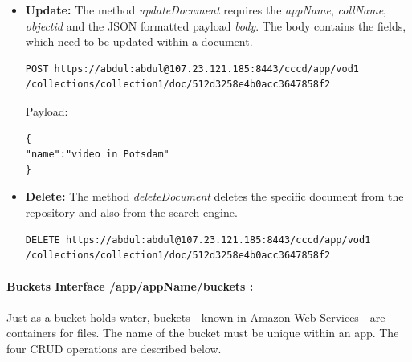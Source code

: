 \begin{itemize}
\item \textbf{Update:} The method \textit{updateDocument} requires the \textit{appName}, \textit{collName}, \textit{objectid} and the \ac{JSON} formatted payload \textit{body}. The body contains  the fields, which need to be updated within a document.

\begin{code}
\begin{verbatim}
POST https://abdul:abdul@107.23.121.185:8443/cccd/app/vod1
/collections/collection1/doc/512d3258e4b0acc3647858f2
\end{verbatim}
Payload:
\begin{verbatim}
{
"name":"video in Potsdam"
}
\end{verbatim}
\end{code}

\item \textbf{Delete:} The method \textit{deleteDocument} deletes the specific document from the repository and also from the search engine.

\begin{code}
\begin{verbatim}
DELETE https://abdul:abdul@107.23.121.185:8443/cccd/app/vod1
/collections/collection1/doc/512d3258e4b0acc3647858f2
\end{verbatim}
\end{code}
 
\end{itemize}
\paragraph{Buckets Interface /app/{appName}/buckets :} Just as a bucket holds water, buckets - known in Amazon Web Services - are containers for files. The name of the bucket must be unique within an app. The four \ac{CRUD} operations are described below.


